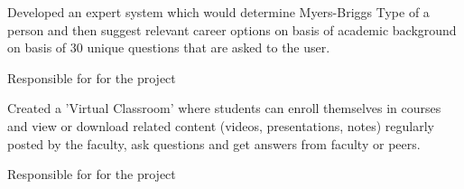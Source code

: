\documentclass[]{deedy-resume-openfont}
\begin{document}
\begin{minipage}[t]{0.66\textwidth}

{}
\vspace{\topsep} %
\begin{tightemize}
\item Developed an expert system which would determine Myers-Briggs Type of a person and then suggest relevant career options on basis of academic background on basis of 30 unique questions that are asked to the user.
\item Responsible for  for the project
\end{tightemize}
\sectionsep

\href{https://github.com/Ellusionists/VirtualClassroom}{}
\begin{tightemize}
\item Created a 'Virtual Classroom' where students can enroll themselves in courses and view or download related content (videos, presentations, notes) regularly posted by the faculty, ask questions and get answers from faculty or peers.
\item Responsible for  for the project
\end{tightemize}
\sectionsep


\end{minipage}
\end{document}
